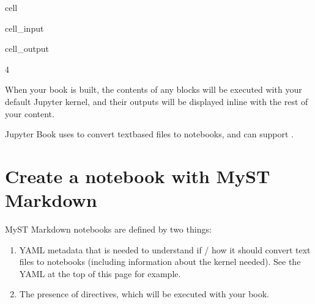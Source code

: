 \documentclass[letterpaper,10pt,english]{jupyterBook}
\begin{document}
\begin{sphinxuseclass}{cell}\begin{sphinxVerbatimInput}

\begin{sphinxuseclass}{cell_input}
\begin{sphinxVerbatim}[commandchars=\\\{\}]
  
\end{sphinxVerbatim}

\end{sphinxuseclass}\end{sphinxVerbatimInput}
\begin{sphinxVerbatimOutput}

\begin{sphinxuseclass}{cell_output}
\begin{sphinxVerbatim}[commandchars=\\\{\}]
4
\end{sphinxVerbatim}

\end{sphinxuseclass}\end{sphinxVerbatimOutput}

\end{sphinxuseclass}
\sphinxAtStartPar
When your book is built, the contents of any  blocks will be
executed with your default Jupyter kernel, and their outputs will be displayed
in\sphinxhyphen{}line with the rest of your content.


\nopagebreak


\sphinxAtStartPar
Jupyter Book uses  to convert text\sphinxhyphen{}based files to notebooks, and can support .




\section{Create a notebook with MyST Markdown}
\label{\detokenize{markdown-notebooks:create-a-notebook-with-myst-markdown}}
\sphinxAtStartPar
MyST Markdown notebooks are defined by two things:
\begin{enumerate}
%
\item {} 
\sphinxAtStartPar
YAML metadata that is needed to understand if / how it should convert text files to notebooks (including information about the kernel needed).
See the YAML at the top of this page for example.

\item {} 
\sphinxAtStartPar
The presence of  directives, which will be executed with your book.

\end{enumerate}
\end{document}
